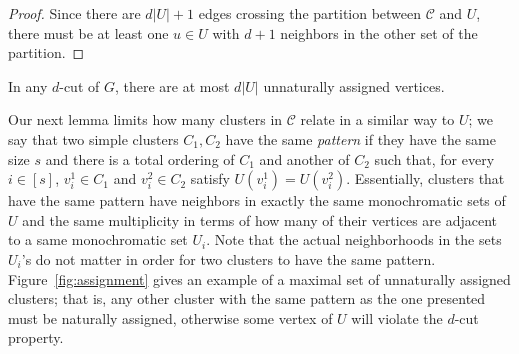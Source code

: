 \documentclass[a4paper,UKenglish,cleveref, autoref]{lipics-v2019}
\newcommand{\ig}[1]{\textcolor{red}{[Ig: #1]}}
\newcommand{\tdef}[1]{\emph{#1}}
\begin{document}
\begin{proof}
    Since there are $d|U| + 1$ edges crossing the partition between $\mathcal{C}$ and $U$, there must be at least one $u \in U$ with $d+1$ neighbors in the other set of the partition.
\end{proof}

\begin{corollary}
    \label{cor:constrained_unnatural}
    In any $d$-cut of $G$, there are at most $d|U|$ unnaturally assigned vertices.
\end{corollary}


Our next lemma limits how many clusters in $\mathcal{C}$ relate in a similar way to $U$; we say that two simple clusters $C_1, C_2$ have the same \tdef{pattern} if they have the same size $s$ and there is a total ordering of $C_1$ and another of $C_2$ such that, for every $i \in [s]$, $v_i^1 \in C_1$ and $v_i^2 \in C_2$ satisfy $U(v_i^1) = U(v_i^2)$.
Essentially, clusters that have the same pattern have neighbors in exactly the same monochromatic sets of $U$ and the same multiplicity in terms of how many of their vertices are adjacent to a same monochromatic set $U_i$. Note that the actual neighborhoods in the sets $U_i$'s do not matter in order for two clusters to have the same pattern.
Figure~\ref{fig:assignment} gives an example of a maximal set of unnaturally assigned clusters; that is, any other cluster with the same pattern as the one presented must be naturally assigned, otherwise some vertex of $U$ will violate the $d$-cut property.
\end{document}

